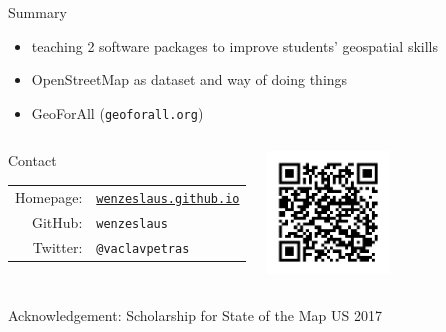 \documentclass[xcolor={dvipsnames,usenames},beamer,aspectratio=169]{beamer}
\begin{document}
\begin{frame}{}

\begin{block}{Summary}
 \begin{itemize}
  \item teaching 2 software packages to improve students' geospatial skills
  \item OpenStreetMap as dataset and way of doing things
  \item GeoForAll (\texttt{geoforall.org})
 \end{itemize}

\end{block}

\bigskip

\begin{columns}[c]


\begin{block}{Contact}
\begin{tabular}{rl}
 Homepage: &\href{https://wenzeslaus.github.io}{\texttt{wenzeslaus.github.io}}
 \\
 GitHub: &\texttt{wenzeslaus}
 \\
 Twitter: &\texttt{@vaclavpetras}
\end{tabular}
\end{block}


\centering
\includegraphics[width=0.5\textwidth]{./images/general/slides_qr}

\end{columns}

\small
Acknowledgement:
Scholarship for State of the Map US 2017

\end{frame}
\end{document}
